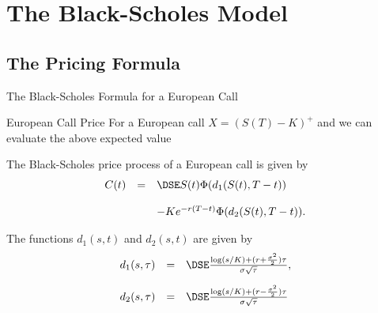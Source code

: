 \section{The Black-Scholes Model}

	\begin{center}
	\end{center}

\subsection{The Pricing Formula}

The Black-Scholes Formula for a European Call
\begin{center}
\begin{figure}
  \centering
   \qquad
   \qquad
\end{figure}
\end{center}



%
%
%
%


European Call Price
	For a European call $X = (S(T)-K)^+$ and  we can evaluate the
	above expected value

	The Black-Scholes price
	pro\-cess of a European call is given by
		$$
		\begin{array}{lll}
		C(t) &=&\DSE S(t) \Phi(d_1(S(t), T-t))\\*[12pt]
		&&- K e^{-r(T-t)} \Phi(d_2(S(t), T-t)).
		\end{array}
		$$
	
	The functions $d_1(s,t)$ and $d_2(s,t)$ are given by
		$$
		\begin{array}{lll}
		d_1(s,\tau) &=&\DSE \frac{\log(s/K) + (r +
		\frac{\sigma^2}{2})\tau}{\sigma \sqrt{\tau}},\\*[12pt] d_2(s,\tau) &=&\DSE
		 \frac{\log(s/K) + (r -
		\frac{\sigma^2}{2})\tau}{\sigma \sqrt{\tau}}
		\end{array}
		$$


